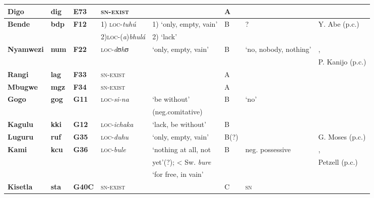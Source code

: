 \documentclass[output=paper]{langsci/langscibook}
\begin{document}
\begin{sidewaystable}[p]%
\begin{scriptsize}
\begin{tabularx}{\textwidth}{llllllll}
\lsptoprule
\textbf{Digo}		&\textbf{dig}		&\textbf{E73}	&\textsc{sn-exist}	&\textendash								&A{}	&\textendash										&\citet{Nicolle2013}\\\midrule
\textbf{Bende} 	&\textbf{bdp} 	&\textbf{F12} 	&1) \textsc{loc}-\textit{tuh\'u}&1) `only, empty, vain'			&B{}	&?												&Y. Abe (p.c.)\\
				&				&				&2)\textsc{loc}-(\textit{a})\textit{bhul\'a}&2) `lack'\\\midrule
\textbf{Nyamwezi}&\textbf{num}	&\textbf{F22}	&\textsc{loc}-\textit{dʊhʊ}&‘only, empty, vain'				&B{}	&`no, nobody, nothing'							&\citet{MagangaSchadeberg1992},\\
				&				&				&				&										&		&												&P. Kanijo (p.c.)\\\midrule
\textbf{Rangi} 	&\textbf{lag}		&\textbf{F33}	&\textsc{sn-exist}	&\textendash								&A{}	&												&\citet{Gibson2012,Dunham2005}\\\midrule
\textbf{Mbugwe} 	&\textbf{mgz} 	&\textbf{F34}	&\textsc{sn-exist}
&\textendash								&A 		&
&\citet{GibsonWilhelmsen2015}\\\midrule
\textbf{Gogo} 	&\textbf{gog} 	&\textbf{G11} 	&\textsc{loc}-\textit{si-na}&`be without'					&B{}	&`no'											&\citet{Cordell1941}\\
				&				&				&				&(neg.comitative)\\\midrule
\textbf{Kagulu} 	&\textbf{kki} 	&\textbf{G12} 	&\textsc{loc}-\textit{ichaka}&`lack, be without'				&B 		&												&\citet{Petzell2008}\\\midrule
\textbf{Luguru} 	&\textbf{ruf}		&\textbf{G35}	&\textsc{loc}-\textit{duhu}&`only, empty, vain'				&B(?) 	&												&G. Moses (p.c.)\\\midrule
\textbf{Kami}	&\textbf{kcu}	&\textbf{G36}	&\textsc{loc}-\textit{bule}&`nothing at all, not				&B{}	&neg. possessive									&\citet{PetzellAunio2016},\\
				&				&				&				&yet'(?); < Sw. \textit{bure}				&		&												&Petzell (p.c.)\\
				&				&				&				&`for free, in vain'\\\midrule
\textbf{Kisetla}	&\textbf{sta} 	&\textbf{G40C}	&\textsc{sn-exist}&\textendash								&C 		&\textsc{sn}										&\citet{Vitale1980}\\

\end{tabularx}
\end{scriptsize}
\end{sidewaystable}
\end{document}
